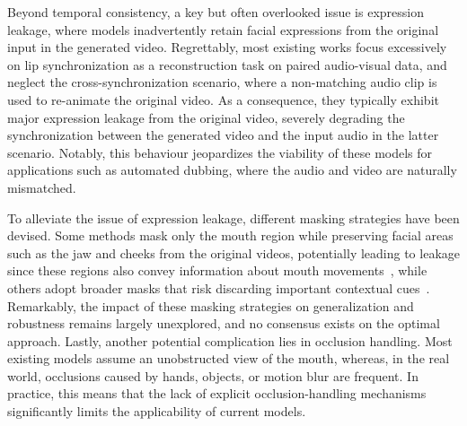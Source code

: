 Beyond temporal consistency, a key but often overlooked issue is expression leakage, where models inadvertently retain facial expressions from the original input in the generated video. Regrettably, most existing works focus excessively on lip synchronization as a reconstruction task on paired audio-visual data, and neglect the cross-synchronization scenario, where a non-matching audio clip is used to re-animate the original video. As a consequence, they typically exhibit major expression leakage from the original video, severely degrading the synchronization between the generated video and the input audio in the latter scenario. Notably, this behaviour jeopardizes the viability of these models for applications such as automated dubbing, where the audio and video are naturally mismatched. 

To alleviate the issue of expression leakage, different masking strategies have been devised. Some methods mask only the mouth region while preserving facial areas such as the jaw and cheeks from the original videos, potentially leading to leakage since these regions also convey information about mouth movements~\cite{StyleLipSync, DINet}, while others adopt broader masks that risk discarding important contextual cues~\cite{zhang_musetalk_2024, VideoReTalking}. Remarkably, the impact of these masking strategies on generalization and robustness remains largely unexplored, and no consensus exists on the optimal approach. Lastly, another potential complication lies in occlusion handling. Most existing models assume an unobstructed view of the mouth, whereas, in the real world, occlusions caused by hands, objects, or motion blur are frequent. In practice, this means that the lack of explicit occlusion-handling mechanisms significantly limits the applicability of current models. 

